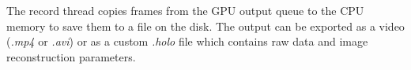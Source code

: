 The record thread copies frames from the GPU output queue to the CPU memory to save them to a file on the disk. The output can be exported as a video (\textit{.mp4} or \textit{.avi}) or as a custom \textit{.holo} file which contains raw data and image reconstruction parameters.